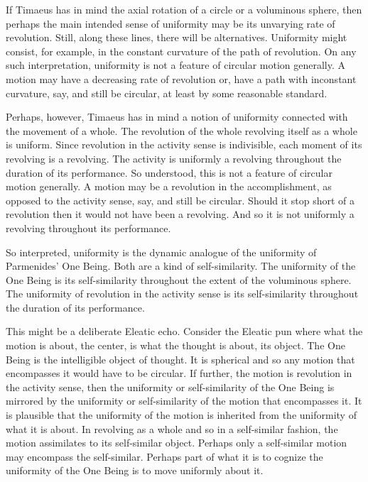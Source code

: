 If Timaeus has in mind the axial rotation of a circle or a voluminous sphere, then perhaps the main intended sense of uniformity may be its unvarying rate of revolution. Still, along these lines, there will be alternatives. Uniformity might consist, for example, in the constant curvature of the path of revolution. On any such interpretation, uniformity is not a feature of circular motion generally. A motion may have a decreasing rate of revolution or, have a path with inconstant curvature, say, and still be circular, at least by some reasonable standard.


Perhaps, however, Timaeus has in mind a notion of uniformity connected with the movement of a whole. The revolution of the whole revolving itself as a whole is uniform. Since revolution in the activity sense is indivisible, each moment of its revolving is a revolving. The activity is uniformly a revolving throughout the duration of its performance. So understood, this is not a feature of circular motion generally. A motion may be a revolution in the accomplishment, as opposed to the activity sense, say, and still be circular. Should it stop short of a revolution then it would not have been a revolving. And so it is not uniformly a revolving throughout its performance.

So interpreted, uniformity is the dynamic analogue of the uniformity of Parmenides' One Being. Both are a kind of self-similarity. The uniformity of the One Being is its self-similarity throughout the extent of the voluminous sphere. The uniformity of revolution in the activity sense is its self-similarity throughout the duration of its performance.

This might be a deliberate Eleatic echo. Consider the Eleatic pun where what the motion is about, the center, is what the thought is about, its object. The One Being is the intelligible object of thought. It is spherical and so any motion that encompasses it would have to be circular. If further, the motion is revolution in the activity sense, then the uniformity or self-similarity of the One Being is mirrored by the uniformity or self-similarity of the motion that encompasses it. It is plausible that the uniformity of the motion is inherited from the uniformity of what it is about. In revolving as a whole and so in a self-similar fashion, the motion assimilates to its self-similar object. Perhaps only a self-similar motion may encompass the self-similar. Perhaps part of what it is to cognize the uniformity of the One Being is to move uniformly about it.

